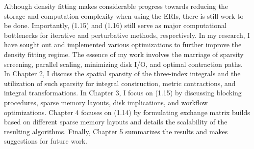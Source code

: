 Although density fitting makes considerable progress towards reducing the storage and computation complexity when
using the ERIs, there is still work to be done. Importantly, (1.15) and (1.16) still serve as major computational
bottlenecks for iterative and perturbative methods, respectively. In my research, I have sought out and implemented various 
optimizations to further improve the density fitting regime. The essence of my work involves the marriage of sparsity screening,
parallel scaling, minimizing disk I/O, and optimal contraction paths. 
In Chapter 2, I discuss the spatial sparsity of the three-index integrals and the utilization of such sparsity for integral 
construction, metric contractions, and integral transformations.
In Chapter 3, I focus on (1.15) by discussing blocking procedures, sparse memory layouts, disk implications,
and workflow optimizations.
Chapter 4 focuses on (1.14) by formulating exchange matrix builds based on different sparse memory layouts and details 
the scalability of the resulting algorithms.
Finally, Chapter 5 summarizes the results and makes suggestions for future work.



